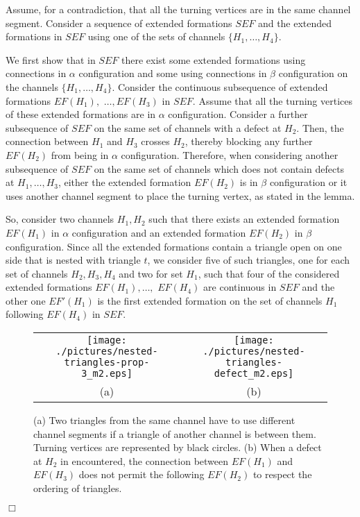 \documentclass[a4paper,10pt]{llncs}
\newcounter{prop}
\renewenvironment{proof}
{{\bf Proof:}}{\hspace*{\fill}$\Box$\par\vspace{2mm}}
\begin{document}
\begin{proof}
Assume, for a contradiction, that all the turning vertices are in the same channel segment. Consider a sequence of extended formations $SEF$ and the extended formations in $SEF$ using one of the sets of channels $\{H_1,\ldots ,H_4\}$.

We first show that in $SEF$ there exist some extended formations using connections in $\alpha$ configuration and some using connections in $\beta$ configuration on the channels $\{H_1,\ldots ,H_4\}$. Consider the continuous subsequence of extended formations $EF(H_1),$ $\ldots,EF(H_3)$ in $SEF$. Assume that all the turning vertices of these extended formations are in $\alpha$ configuration. Consider a further subsequence of $SEF$ on the same set of channels with a defect at $H_2$. Then, the connection between $H_1$ and $H_3$ crosses $H_2$, thereby blocking any further $EF(H_2)$ from being in $\alpha$ configuration. Therefore, when considering another subsequence of $SEF$ on the same set of channels which does not contain defects at $H_1,\ldots,H_3$, either the extended formation $EF(H_2)$ is in $\beta$ configuration or it uses another channel segment to place the turning vertex, as stated in the lemma.

So, consider two channels $H_1,H_2$ such that there exists an extended formation $EF(H_1)$ in $\alpha$ configuration and an extended formation $EF(H_2)$ in $\beta$ configuration. Since all the extended formations contain a triangle open on one side that is nested with triangle $t$, we consider five of such triangles, one for each set of channels $H_2,H_3,H_4$ and two for set $H_1$, such that four of the considered extended formations $EF(H_1),\ldots,$ $EF(H_4)$ are continuous in $SEF$ and the other one $EF'(H_1)$ is the first extended formation on the set of channels $H_1$ following $EF(H_4)$ in $SEF$.

\begin{figure}[ht]
\begin{center}
\begin{tabular}{c c}
\mbox{\texttt{[image: ./pictures/nested-triangles-prop-3\_m2.eps]}} \hspace{0.1cm} &
\mbox{\texttt{[image: ./pictures/nested-triangles-defect\_m2.eps]}} \\
(a) & (b)\\
\end{tabular}
\caption{(a) Two triangles from the same channel have to use different channel segments if a triangle of another channel is between them. Turning vertices are represented by black circles. (b) When a defect at $H_2$ in encountered, the connection between $EF(H_1)$ and $EF(H_3)$ does not permit the following $EF(H_2)$ to respect the ordering of triangles.}
\label{fig:nested-triangles-prop-3}
\end{center}
\end{figure}


\end{proof}
\end{document}
